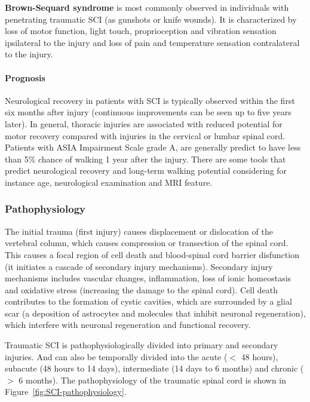 \documentclass[12pt,article,oneside,a4paper]{memoir}
\begin{document}
\textbf{Brown-Sequard syndrome} is most commonly observed in individuals with
penetrating traumatic SCI (as gunshots or knife wounds). It is characterized by
loss of motor function, light touch, proprioception and vibration sensation
ipsilateral to the injury and loss of pain and temperature sensation
contralateral to the injury.

\paragraph{Prognosis}
Neurological recovery in patients with SCI is typically observed within the
first six months after injury (continuous improvements can be seen up to five
years later). In general, thoracic injuries are associated with reduced
potential for motor recovery compared with injuries in the cervical or lumbar
spinal cord.
Patients with ASIA Impairment Scale grade A, are generally predict to have less
than 5\% chance of walking 1 year after the injury. There are some tools that
predict neurological recovery and long-term walking potential considering for
instance age, neurological examination and MRI feature.

\subsubsection{Pathophysiology}
The initial trauma (first injury) causes displacement or dislocation of the
vertebral column, which causes compression or transection of the spinal cord.
This causes a focal region of cell death and blood-spinal cord barrier
disfunction (it initiates a cascade of secondary injury mechanisms). Secondary
injury mechanisms includes vascular changes, inflammation, loss of ionic
homeostasis and oxidative stress (increasing the damage to the spinal cord).
Cell death contributes to the formation of cystic cavities, which are
surrounded by a glial scar (a deposition of astrocytes and molecules that
inhibit neuronal regeneration), which interfere with neuronal regeneration and
functional recovery.

Traumatic SCI is pathophysiologically divided into primary and secondary
injuries. And can also be temporally divided into the acute ($<$ 48 hours),
subacute (48 hours to 14 days), intermediate (14 days to 6 months) and chronic
($>$ 6 months). The pathophysiology of the traumatic spinal cord is shown in
Figure~\ref{fig:SCI-pathophysiology}.
\end{document}
